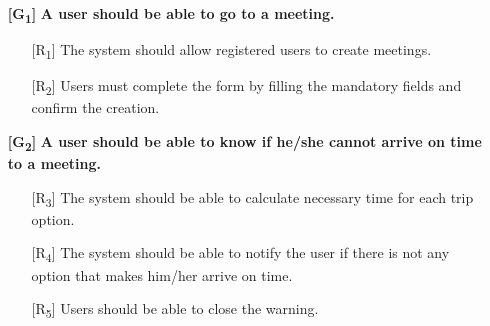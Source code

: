 \documentclass[12pt,titlepage]{article}
\begin{document}
\begin{itemize}
\item[\textbf{ {[G\textsubscript{1}]}}]	\textbf{	A user should be able to go to a meeting.}
\begin{itemize}
\item[{[R\textsubscript{1}]}] The system should allow registered users to create meetings.
\item[{[R\textsubscript{2}]}] Users must complete the form by filling the mandatory fields and confirm the creation.

\end{itemize}
\item[\textbf{ {[G\textsubscript{2}]}}]	\textbf{	A user should be able to know if he/she cannot arrive on time to a meeting.}
\begin{itemize}
\item[{[R\textsubscript{3}]}] The system should be able to calculate necessary time for each trip option.
\item[{[R\textsubscript{4}]}]  The system should be able to notify the user if there is not any option that makes him/her arrive on time.
\item[{[R\textsubscript{5}]}] Users should be able to close the warning.
\end{itemize}


\end{itemize}
\end{document}
